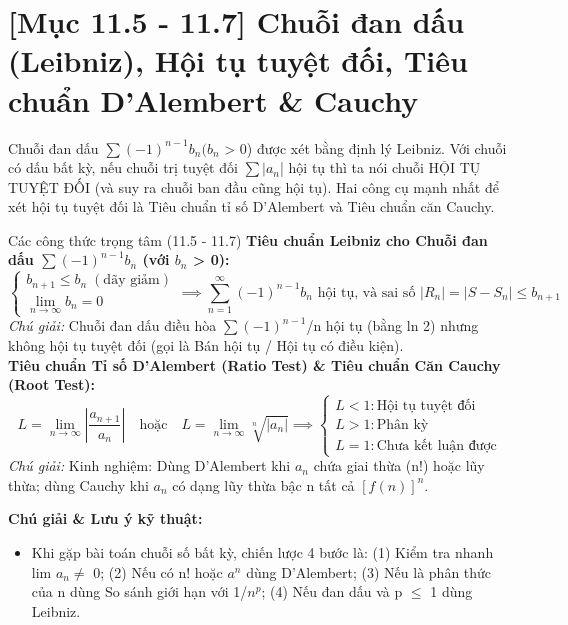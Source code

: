 \documentclass[11pt,a4paper,oneside]{book}
\begin{document}
\section{[Mục 11.5 - 11.7] Chuỗi đan dấu (Leibniz), Hội tụ tuyệt đối, Tiêu chuẩn D'Alembert \& Cauchy}
Chuỗi đan dấu $\sum (-1)^{n-1} b_n (b_n$ > 0) được xét bằng định lý Leibniz. Với chuỗi có dấu bất kỳ, nếu chuỗi trị tuyệt đối $\sum |a_n$| hội tụ thì ta nói chuỗi HỘI TỤ TUYỆT ĐỐI (và suy ra chuỗi ban đầu cũng hội tụ). Hai công cụ mạnh nhất để xét hội tụ tuyệt đối là Tiêu chuẩn tỉ số D'Alembert và Tiêu chuẩn căn Cauchy.

\begin{congthuc}{Các công thức trọng tâm (11.5 - 11.7)}
\noindent\textbf{Tiêu chuẩn Leibniz cho Chuỗi đan dấu $\sum (-1)^{n-1} b_n$ (với $b_n$ > 0):}
\[ \begin{cases} b_{n+1} \le b_n \;(\text{dãy giảm}) \\ \lim_{n \to \infty} b_n = 0 \end{cases} \implies \sum_{n=1}^\infty (-1)^{n-1}b_n \text{ hội tụ, và sai số } |R_n| = |S - S_n| \le b_{n+1} \]
\noindent\textit{Chú giải:} Chuỗi đan dấu điều hòa $\sum (-1)^{n-1}$/n hội tụ (bằng ln 2) nhưng không hội tụ tuyệt đối (gọi là Bán hội tụ / Hội tụ có điều kiện).\\[4pt]
\noindent\textbf{Tiêu chuẩn Tỉ số D'Alembert (Ratio Test) \& Tiêu chuẩn Căn Cauchy (Root Test):}
\[ L = \lim_{n \to \infty} \left|\frac{a_{n+1}}{a_n}\right| \quad \text{hoặc} \quad L = \lim_{n \to \infty} \sqrt[n]{|a_n|} \implies \begin{cases} L < 1 : \text{Hội tụ tuyệt đối} \\ L > 1 : \text{Phân kỳ} \\ L = 1 : \text{Chưa kết luận được} \end{cases} \]
\noindent\textit{Chú giải:} Kinh nghiệm: Dùng D'Alembert khi $a_n$ chứa giai thừa (n!) hoặc lũy thừa; dùng Cauchy khi $a_n$ có dạng lũy thừa bậc n tất cả $[f(n)]^n$.\\[4pt]
\end{congthuc}

\noindent\textbf{Chú giải \& Lưu ý kỹ thuật:}
\begin{itemize}[leftmargin=1.5em, itemsep=2pt]
  \item Khi gặp bài toán chuỗi số bất kỳ, chiến lược 4 bước là: (1) Kiểm tra nhanh lim $a_n \neq$  0; (2) Nếu có n! hoặc $a^n$ dùng D'Alembert; (3) Nếu là phân thức của n dùng So sánh giới hạn với 1/$n^p$; (4) Nếu đan dấu và p $\le$  1 dùng Leibniz.
\end{itemize}
\end{document}

